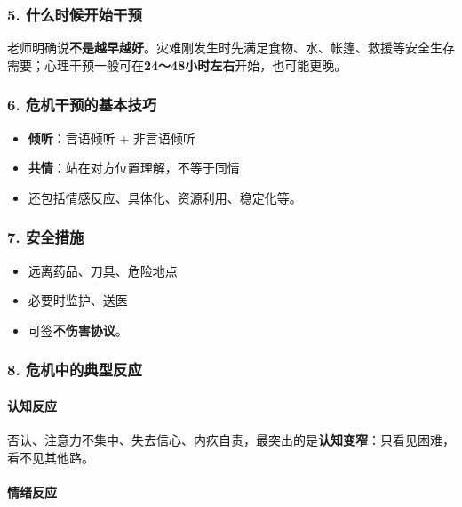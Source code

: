 \documentclass[
  a4paper,
]{ctexart}
\providecommand{\tightlist}{%
  \setlength{\itemsep}{0pt}\setlength{\parskip}{0pt}}
\begin{document}
\subsubsection{5.
什么时候开始干预}\label{ux4ec0ux4e48ux65f6ux5019ux5f00ux59cbux5e72ux9884}

老师明确说\textbf{不是越早越好}。灾难刚发生时先满足食物、水、帐篷、救援等安全生存需要；心理干预一般可在\textbf{24～48小时左右}开始，也可能更晚。

\subsubsection{6.
危机干预的基本技巧}\label{ux5371ux673aux5e72ux9884ux7684ux57faux672cux6280ux5de7}

\begin{itemize}
\tightlist
\item
  \textbf{倾听}：言语倾听 + 非言语倾听
\item
  \textbf{共情}：站在对方位置理解，不等于同情
\item
  还包括情感反应、具体化、资源利用、稳定化等。
\end{itemize}

\subsubsection{7. 安全措施}\label{ux5b89ux5168ux63aaux65bd}

\begin{itemize}
\tightlist
\item
  远离药品、刀具、危险地点
\item
  必要时监护、送医
\item
  可签\textbf{不伤害协议}。
\end{itemize}

\subsubsection{8.
危机中的典型反应}\label{ux5371ux673aux4e2dux7684ux5178ux578bux53cdux5e94}

\paragraph{认知反应}\label{ux8ba4ux77e5ux53cdux5e94}

否认、注意力不集中、失去信心、内疚自责，最突出的是\textbf{认知变窄}：只看见困难，看不见其他路。

\paragraph{情绪反应}\label{ux60c5ux7eeaux53cdux5e94}
\end{document}
